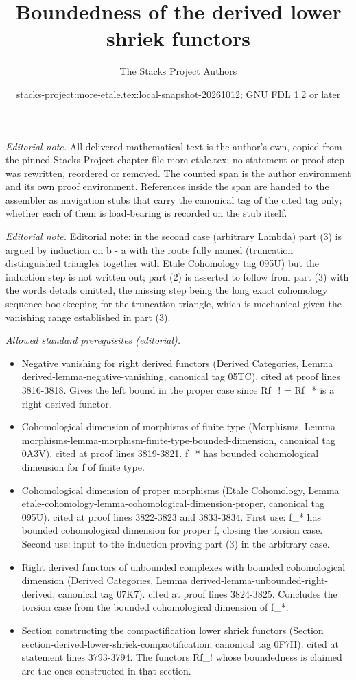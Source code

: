 \documentclass{stacks-project}
\title{Boundedness of the derived lower shriek functors}
\author{The Stacks Project Authors}
\date{stacks-project:more-etale.tex:local-snapshot-20261012; GNU FDL 1.2 or later}
\theoremstyle{plain}
\theoremstyle{definition}
\theoremstyle{remark}
\numberwithin{equation}{subsection}
\begin{document}
\maketitle
\setcounter{subsection}{1}
\noindent\textit{Editorial note.} All delivered mathematical text is the author's own, copied from the pinned Stacks Project chapter file more-etale.tex; no statement or proof step was rewritten, reordered or removed. The counted span is the author environment and its own proof environment. References inside the span are handed to the assembler as navigation stubs that carry the canonical tag of the cited tag only; whether each of them is load-bearing is recorded on the stub itself.\par\medskip
\noindent\textit{Editorial note.} Editorial note: in the second case (arbitrary Lambda) part (3) is argued by induction on b - a with the route fully named (truncation distinguished triangles together with Etale Cohomology tag 095U) but the induction step is not written out; part (2) is asserted to follow from part (3) with the words details omitted, the missing step being the long exact cohomology sequence bookkeeping for the truncation triangle, which is mechanical given the vanishing range established in part (3).\par\medskip
\noindent\textit{Allowed standard prerequisites (editorial).}\begin{itemize}
\item Negative vanishing for right derived functors (Derived Categories, Lemma derived-lemma-negative-vanishing, canonical tag 05TC). cited at proof lines 3816-3818. Gives the left bound in the proper case since Rf\_! = Rf\_* is a right derived functor.
\item Cohomological dimension of morphisms of finite type (Morphisms, Lemma morphisms-lemma-morphism-finite-type-bounded-dimension, canonical tag 0A3V). cited at proof lines 3819-3821. f\_* has bounded cohomological dimension for f of finite type.
\item Cohomological dimension of proper morphisms (Etale Cohomology, Lemma etale-cohomology-lemma-cohomological-dimension-proper, canonical tag 095U). cited at proof lines 3822-3823 and 3833-3834. First use: f\_* has bounded cohomological dimension for proper f, closing the torsion case. Second use: input to the induction proving part (3) in the arbitrary case.
\item Right derived functors of unbounded complexes with bounded cohomological dimension (Derived Categories, Lemma derived-lemma-unbounded-right-derived, canonical tag 07K7). cited at proof lines 3824-3825. Concludes the torsion case from the bounded cohomological dimension of f\_*.
\item Section constructing the compactification lower shriek functors (Section section-derived-lower-shriek-compactification, canonical tag 0F7H). cited at statement lines 3793-3794. The functors Rf\_! whose boundedness is claimed are the ones constructed in that section.
\end{itemize}\medskip
\end{document}
